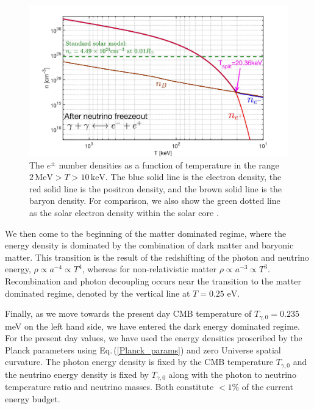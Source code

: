 \documentclass[universe,article,submit,moreauthors,pdftex,a4paper]{Definitions/mdpi}
\newcommand{\eV}{\text{ eV}}
\newcommand{\req}[1]{Eq.\,(\ref{#1})}
\begin{document}
\begin{figure}[h]
  \centering
  \includegraphics[width=\textwidth]{./plots/NewDensity_cm3.jpg}
  \caption{The $e^{\pm}$ number densities as a function of temperature in the range $2\,\mathrm{MeV}>T>10\,\mathrm{keV}$. The blue solid line is the electron density, the red solid line is the positron density, and the brown solid line is the baryon density. For comparison, we also show the green dotted line as the solar electron density within the solar core \cite{Bahcall:2000nu}.}
  \label{Density_fig} 
\end{figure}

We then come to the beginning of the matter dominated regime, where the energy density is dominated by the combination of dark matter and baryonic matter.  This transition is the result of the redshifting of the photon and neutrino energy, $\rho\propto a^{-4} \propto T^4$, whereas for non-relativistic matter $\rho\propto a^{-3}\propto T^3$.  Recombination and photon decoupling occurs near the transition to the matter dominated regime, denoted by the vertical line at $T=0.25\eV$.

Finally, as we move towards the present day CMB temperature of $T_{\gamma,0}=0.235$ meV on the left hand side, we have entered the dark energy dominated regime.  For the present day values, we have used the energy densities proscribed by the Planck parameters \cite{Planck:2013pxb} using \req{Planck_params} and zero Universe spatial curvature. The photon energy density is fixed by the CMB temperature $T_{\gamma,0}$ and the neutrino energy density is fixed by $T_{\gamma,0}$ along with the photon to neutrino temperature ratio and neutrino masses.  Both constitute $<1\%$ of the current energy budget.
\end{document}
